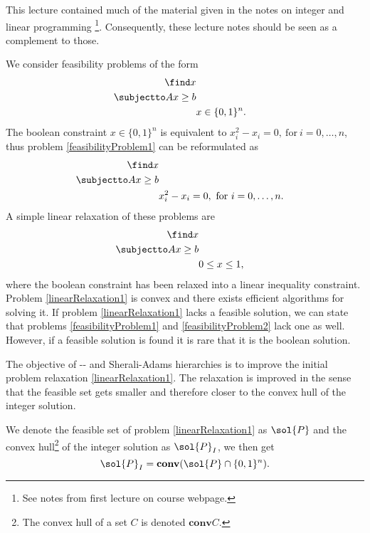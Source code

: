 \documentclass[a4paper,twoside,justified]{tufte-handout}
\begin{document}
 

This lecture contained much of the material given in the notes on integer and linear programming \footnote{See notes from first lecture on course webpage.}. Consequently, these lecture notes should be seen as a complement to those.

We consider feasibility problems of the form 
\begin{alignat}{2}
\label{feasibilityProblem1}
  \find x\notag \\
  \subjectto Ax \geq b \\
  & x \in \{0,1\}^n.\notag
\end{alignat}
The boolean constraint $x \in \{0,1\}^n$ is equivalent to $x_i^2-x_i=0,\ \text{for}\ i=0,\ldots,n$, thus problem \eqref{feasibilityProblem1} can be reformulated as
\begin{alignat}{2}
\label{feasibilityProblem2}
  \find x\notag \\
  \subjectto Ax \geq b \\
  & x_i^2-x_i=0,\ \text{for}\ i=0,\ldots,n.\notag
\end{alignat}
A simple linear relaxation of these problems are  
\begin{alignat}{2}
\label{linearRelaxation1}
  \find x\notag \\
  \subjectto Ax \geq b \\
  & 0\leq x\leq 1,\notag
\end{alignat}
where the boolean constraint has been relaxed into a linear inequality constraint. Problem \eqref{linearRelaxation1} is convex and there exists efficient algorithms for solving it. If problem \eqref{linearRelaxation1} lacks a feasible solution, we can state that problems \eqref{feasibilityProblem1} and \eqref{feasibilityProblem2} lack one as well. However, if a feasible solution is found it is rare that it is the boolean solution.

The objective of \Lovasz-\Schrijver- and Sherali-Adams hierarchies is to improve the initial problem relaxation \eqref{linearRelaxation1}. The relaxation is improved in the sense that the feasible set gets smaller and therefore closer to the convex hull of the integer solution. 

We denote the feasible set of problem \eqref{linearRelaxation1} as $\sol{P}$ and the convex hull\footnote{The convex hull of a set $C$ is denoted $\mathbf{conv}C$.} of the integer solution as $\sol{P}_{I}$, we then get
\begin{equation}
\sol{P}_{I} = \mathbf{conv}(\sol{P}\cap\{0,1\}^n).
\end{equation}
\end{document}
